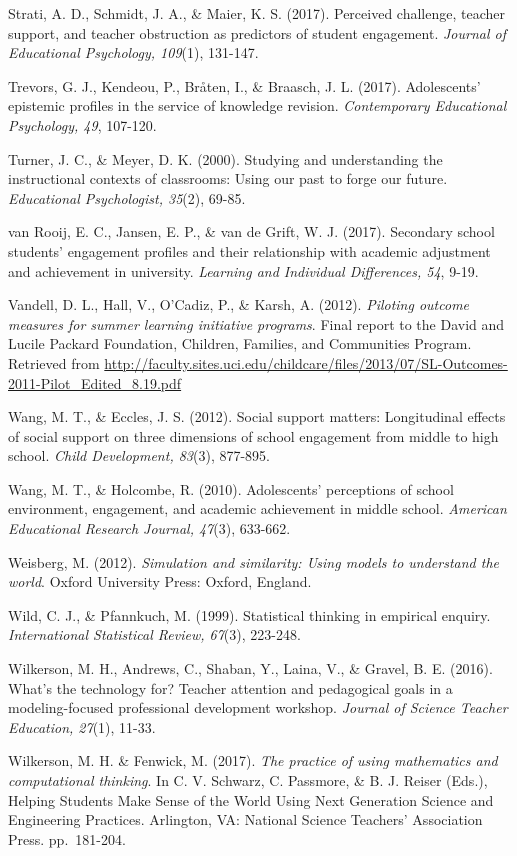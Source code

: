 \documentclass[]{msu-thesis}
\theoremstyle{definition}
\theoremstyle{definition}
\theoremstyle{definition}
\theoremstyle{remark}
\begin{document}
Strati, A. D., Schmidt, J. A., \& Maier, K. S. (2017). Perceived
challenge, teacher support, and teacher obstruction as predictors of
student engagement. \emph{Journal of Educational Psychology, 109}(1),
131-147.

Trevors, G. J., Kendeou, P., Bråten, I., \& Braasch, J. L. (2017).
Adolescents' epistemic profiles in the service of knowledge revision.
\emph{Contemporary Educational Psychology, 49}, 107-120.

Turner, J. C., \& Meyer, D. K. (2000). Studying and understanding the
instructional contexts of classrooms: Using our past to forge our
future. \emph{Educational Psychologist, 35}(2), 69-85.

van Rooij, E. C., Jansen, E. P., \& van de Grift, W. J. (2017).
Secondary school students' engagement profiles and their relationship
with academic adjustment and achievement in university. \emph{Learning
and Individual Differences, 54}, 9-19.

Vandell, D. L., Hall, V., O'Cadiz, P., \& Karsh, A. (2012).
\emph{Piloting outcome measures for summer learning initiative
programs}. Final report to the David and Lucile Packard Foundation,
Children, Families, and Communities Program. Retrieved from
\url{http://faculty.sites.uci.edu/childcare/files/2013/07/SL-Outcomes-2011-Pilot_Edited_8.19.pdf}

Wang, M. T., \& Eccles, J. S. (2012). Social support matters:
Longitudinal effects of social support on three dimensions of school
engagement from middle to high school. \emph{Child Development, 83}(3),
877-895.

Wang, M. T., \& Holcombe, R. (2010). Adolescents' perceptions of school
environment, engagement, and academic achievement in middle school.
\emph{American Educational Research Journal, 47}(3), 633-662.

Weisberg, M. (2012). \emph{Simulation and similarity: Using models to
understand the world}. Oxford University Press: Oxford, England.

Wild, C. J., \& Pfannkuch, M. (1999). Statistical thinking in empirical
enquiry. \emph{International Statistical Review, 67}(3), 223-248.

Wilkerson, M. H., Andrews, C., Shaban, Y., Laina, V., \& Gravel, B. E.
(2016). What's the technology for? Teacher attention and pedagogical
goals in a modeling-focused professional development workshop.
\emph{Journal of Science Teacher Education, 27}(1), 11-33.

Wilkerson, M. H. \& Fenwick, M. (2017). \emph{The practice of using
mathematics and computational thinking}. In C. V. Schwarz, C. Passmore,
\& B. J. Reiser (Eds.), Helping Students Make Sense of the World Using
Next Generation Science and Engineering Practices. Arlington, VA:
National Science Teachers' Association Press. pp.~181-204.
\end{document}
